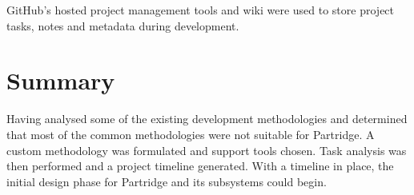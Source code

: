 GitHub's hosted project management tools and wiki were used to store project
tasks, notes and metadata during development.

\section{Summary}

Having analysed some of the existing development methodologies and determined
that most of the common methodologies were not suitable for Partridge. A custom
methodology was formulated and support tools chosen. Task analysis was then
performed and a project timeline generated. With a timeline in place, the
initial design phase for Partridge and its subsystems could begin.
